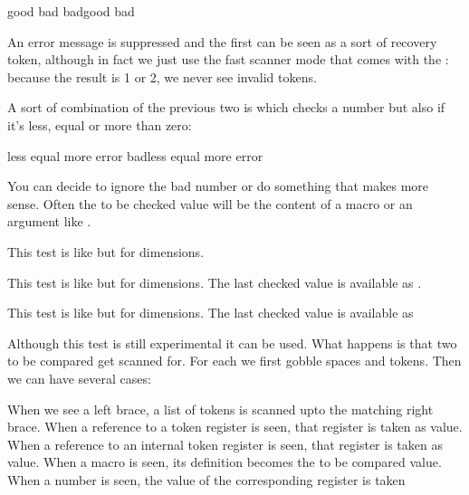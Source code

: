 \starttyping[option=TEX]
\or good \else bad \fi
\ifchknum bad\or good \else bad \fi
\stoptyping

An error message is suppressed and the first \type {\or} can be seen as a sort of
recovery token, although in fact we just use the fast scanner mode that comes
with the \type {\ifcase}: because the result is 1 or 2, we never see invalid
tokens.

\stopsubsection

\startsubsection[title={\tex{ifnumval}}]

A sort of combination of the previous two is \type {\ifnumval} which checks a
number but also if it's less, equal or more than zero:

\starttyping[option=TEX]
\or less \or equal \or more \else error \fi
\ifnumval bad\or less \or equal \or more \else error \fi
\stoptyping

You can decide to ignore the bad number or do something that makes more sense.
Often the to be checked value will be the content of a macro or an argument like
.

\stopsubsection

\startsubsection[title={\tex{ifcmpdim}}]

This test is like \type {\ifcmpnum} but for dimensions.

\stopsubsection

\startsubsection[title={\tex{ifchkdim}}]

This test is like \type {\ifchknum} but for dimensions. The last checked value is
available as \type {\lastchknum}.

\stopsubsection

\startsubsection[title={\tex{ifdimval}}]

This test is like \type {\ifnumval} but for dimensions. The last checked value is
available as \type {\lastchkdim}

\stopsubsection

\startsubsection[title={\tex{iftok}}]

Although this test is still experimental it can be used. What happens is that
two to be compared  get scanned for. For each we first gobble
spaces and \type {\relax} tokens. Then we can have several cases:

\startitemize[n,packed]
    \startitem
        When we see a left brace, a list of tokens is scanned upto the
        matching right brace.
    \stopitem
    \startitem
        When a reference to a token register is seen, that register is taken as
        value.
    \stopitem
    \startitem
        When a reference to an internal token register is seen, that register is
        taken as value.
    \stopitem
    \startitem
        When a macro is seen, its definition becomes the to be compared value.
    \stopitem
    \startitem
        When a number is seen, the value of the corresponding register is taken
    \stopitem
\stopitemize

